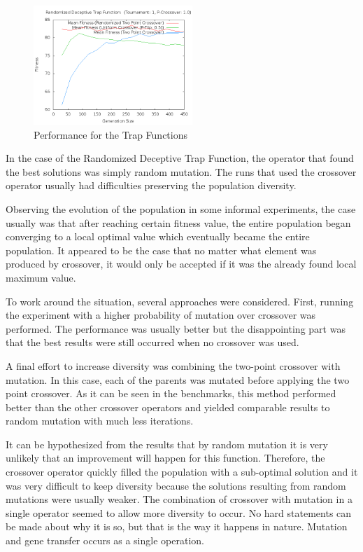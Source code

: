 \documentclass[10pt]{article}
\begin{document}
\begin{figure}[h!]
    \includegraphics[height=170px]{img/RandomizedDeceptiveTrapFunctionCrossoverGens.png}
    \caption[Performance for the Trap Functions]{Performance for the Trap Functions}
\end{figure}

In the case of the Randomized Deceptive Trap Function, the operator that found the best solutions was simply random mutation. The runs that used the crossover operator usually had difficulties preserving the population diversity.

Observing the evolution of the population in some informal experiments, the case usually was that after reaching certain fitness value, the entire population began converging to a local optimal value which eventually became the entire population. It appeared to be the case that no matter what element was produced by crossover, it would only be accepted if it was the already found local maximum value.

To work around the situation, several approaches were considered. First, running the experiment with a higher probability of mutation over crossover was performed. The performance was usually better but the disappointing part was that the best results were still occurred when no crossover was used.

A final effort to increase diversity was combining the two-point crossover with mutation. In this case, each of the parents was mutated before applying the two point crossover. As it can be seen in the benchmarks, this method performed better than the other crossover operators and yielded comparable results to random mutation with much less iterations.

It can be hypothesized from the results that by random mutation it is very unlikely that an improvement will happen for this function. Therefore, the crossover operator quickly filled the population with a sub-optimal solution and it was very difficult to keep diversity because the solutions resulting from random mutations were usually weaker. The combination of crossover with mutation in a single operator seemed to allow more diversity to occur. No hard statements can be made about why it is so, but that is the way it happens in nature. Mutation and gene transfer occurs as a single operation.
\end{document}
